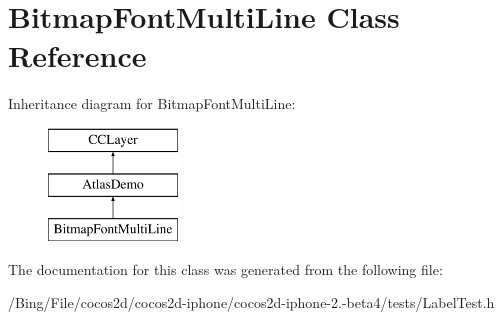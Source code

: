 \hypertarget{interface_bitmap_font_multi_line}{\section{Bitmap\-Font\-Multi\-Line Class Reference}
\label{interface_bitmap_font_multi_line}
}
Inheritance diagram for Bitmap\-Font\-Multi\-Line\-:\begin{figure}[H]
\begin{center}
\leavevmode
\includegraphics[height=3.000000cm]{interface_bitmap_font_multi_line}
\end{center}
\end{figure}


The documentation for this class was generated from the following file\-:\begin{DoxyCompactItemize}
\item 
/\-Bing/\-File/cocos2d/cocos2d-\/iphone/cocos2d-\/iphone-\/2.-\/beta4/tests/Label\-Test.\-h\end{DoxyCompactItemize}

